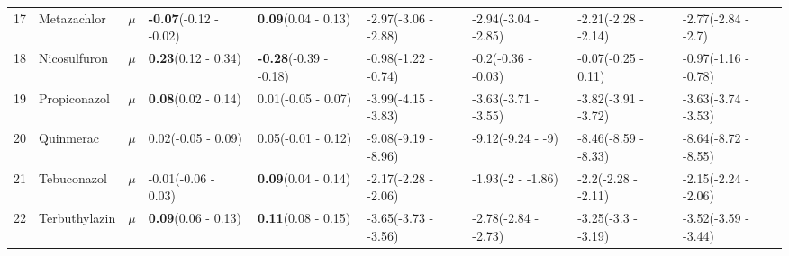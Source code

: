 \begin{longtable}{lp{2cm}p{0.6cm}p{1.8cm}p{1.8cm}p{1.8cm}p{1.8cm}p{1.8cm}p{1.8cm}}
  17 & Metazachlor & $\mu$ & \textbf{-0.07}\newline (-0.12 - -0.02) & \textbf{0.09}\newline (0.04 - 0.13) & -2.97\newline (-3.06 - -2.88) & -2.94\newline (-3.04 - -2.85) & -2.21\newline (-2.28 - -2.14) & -2.77\newline (-2.84 - -2.7) \\ 
  18 & Nicosulfuron & $\mu$ & \textbf{0.23}\newline (0.12 - 0.34) & \textbf{-0.28}\newline (-0.39 - -0.18) & -0.98\newline (-1.22 - -0.74) & -0.2\newline (-0.36 - -0.03) & -0.07\newline (-0.25 - 0.11) & -0.97\newline (-1.16 - -0.78) \\ 
  19 & Propiconazol & $\mu$ & \textbf{0.08}\newline (0.02 - 0.14) & 0.01\newline (-0.05 - 0.07) & -3.99\newline (-4.15 - -3.83) & -3.63\newline (-3.71 - -3.55) & -3.82\newline (-3.91 - -3.72) & -3.63\newline (-3.74 - -3.53) \\ 
  20 & Quinmerac & $\mu$ & 0.02\newline (-0.05 - 0.09) & 0.05\newline (-0.01 - 0.12) & -9.08\newline (-9.19 - -8.96) & -9.12\newline (-9.24 - -9) & -8.46\newline (-8.59 - -8.33) & -8.64\newline (-8.72 - -8.55) \\ 
  21 & Tebuconazol & $\mu$ & -0.01\newline (-0.06 - 0.03) & \textbf{0.09}\newline (0.04 - 0.14) & -2.17\newline (-2.28 - -2.06) & -1.93\newline (-2 - -1.86) & -2.2\newline (-2.28 - -2.11) & -2.15\newline (-2.24 - -2.06) \\ 
  22 & Terbuthylazin & $\mu$ & \textbf{0.09}\newline (0.06 - 0.13) & \textbf{0.11}\newline (0.08 - 0.15) & -3.65\newline (-3.73 - -3.56) & -2.78\newline (-2.84 - -2.73) & -3.25\newline (-3.3 - -3.19) & -3.52\newline (-3.59 - -3.44) \\ 

\end{longtable}
